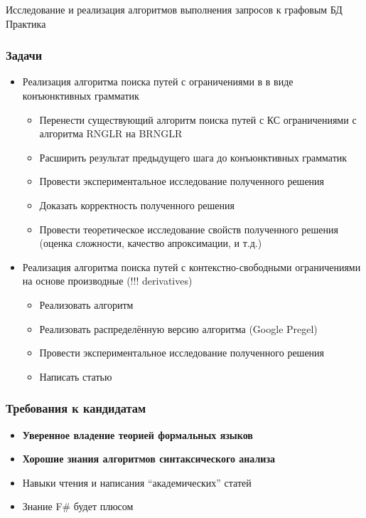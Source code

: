 \documentclass{beamer}
\begin{document}
\begin{frame}[plain,c]
 \transwipe[direction=90]
 \begin{center}
  \Huge Исследование и реализация алгоритмов выполнения запросов к графовым БД \\ Практика
 \end{center}
\end{frame}

\begin{frame}[fragile]
\transwipe[direction=90]
\frametitle{Задачи}
  \begin{itemize}
    \item Реализация алгоритма поиска путей с ограничениями в в виде конъюнктивных грамматик
    \begin{itemize}
       \item Перенести существующий алгоритм поиска путей с КС ограничениями с алгоритма RNGLR 
       на BRNGLR
       \item Расширить результат предыдущего шага до конъюнктивных грамматик
       \item Провести экспериментальное исследование полученного решения
       \item Доказать корректность полученного решения
       \item Провести теоретическое исследование свойств полученного решения (оценка сложности, качество апроксимации, и т.д.)
    \end{itemize}
    \item Реализация алгоритма поиска путей с контекстно-свободными ограничениями на основе 
    производные (!!! derivatives)
    \begin{itemize}
       \item Реализовать алгоритм
       \item Реализовать распределённую версию алгоритма (Google Pregel)
       \item Провести экспериментальное исследование полученного решения
       \item Написать статью
    \end{itemize}

  \end{itemize}  
\end{frame}

\begin{frame}[fragile]
\transwipe[direction=90]
\frametitle{Требования к кандидатам}
  \begin{itemize}
    \item \textbf{Уверенное владение теорией формальных языков}
    \item \textbf{Хорошие знания алгоритмов синтаксического анализа}
    \item Навыки чтения и написания ``академических'' статей
    \item Знание F\# будет плюсом
  \end{itemize}  
\end{frame}
\end{document}

